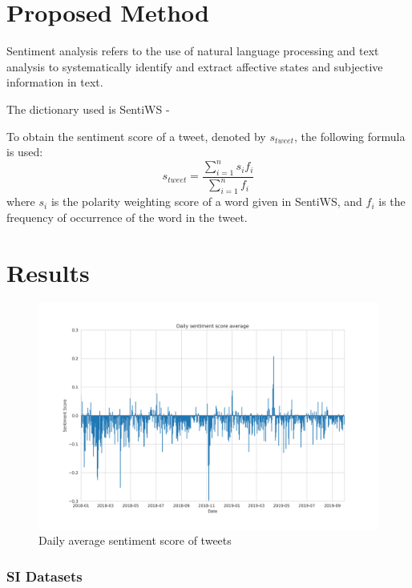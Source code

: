 \documentclass[9pt,twocolumn,twoside,lineno]{pnas-new}
\begin{document}
\section*{Proposed Method}

Sentiment analysis refers to the use of natural language processing and text analysis to systematically identify and extract affective states and subjective information in text. %

The dictionary used is SentiWS - \cite{REMUS10.490}

To obtain the sentiment score of a tweet, denoted by \(s_{tweet}\), the following formula is used: \[s_{tweet} = \frac{\sum_{i=1}^{n} s_i f_i}{\sum_{i=1}^{n} f_i}\] where \(s_i\) is the polarity weighting score of a word given in SentiWS, and \(f_i\) is the frequency of occurrence of the word in the tweet. 

\section*{Results}

\begin{figure} 
	\begin{center}
		\includegraphics[width=\linewidth]{figures/dailyavgsenti}
	\end{center}
	\caption{Daily average sentiment score of tweets}
	\label{fig:tweet_score}
\end{figure}



\subsubsection*{SI Datasets} 
\end{document}
